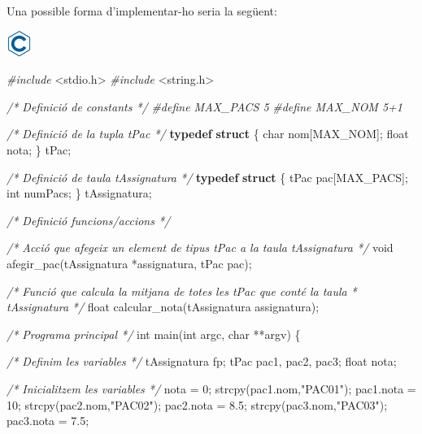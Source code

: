 \documentclass[]{book}
\newenvironment{Shaded}{\begin{snugshade}}{\end{snugshade}}
\newcommand{\CommentTok}[1]{\textcolor[rgb]{0.56,0.35,0.01}{\textit{#1}}}
\newcommand{\DataTypeTok}[1]{\textcolor[rgb]{0.13,0.29,0.53}{#1}}
\newcommand{\DecValTok}[1]{\textcolor[rgb]{0.00,0.00,0.81}{#1}}
\newcommand{\FloatTok}[1]{\textcolor[rgb]{0.00,0.00,0.81}{#1}}
\newcommand{\ImportTok}[1]{#1}
\newcommand{\KeywordTok}[1]{\textcolor[rgb]{0.13,0.29,0.53}{\textbf{#1}}}
\newcommand{\NormalTok}[1]{#1}
\newcommand{\PreprocessorTok}[1]{\textcolor[rgb]{0.56,0.35,0.01}{\textit{#1}}}
\newcommand{\StringTok}[1]{\textcolor[rgb]{0.31,0.60,0.02}{#1}}
\begin{document}
Una possible forma d'implementar-ho seria la següent:

\includegraphics{./img/c.png}

\begin{Shaded}
\begin{Highlighting}[]
\PreprocessorTok{\#include }\ImportTok{\textless{}stdio.h\textgreater{}}
\PreprocessorTok{\#include }\ImportTok{\textless{}string.h\textgreater{}}

\CommentTok{/* Definició de constants */}
\PreprocessorTok{\#define MAX\_PACS 5}
\PreprocessorTok{\#define MAX\_NOM 5+1}

\CommentTok{/* Definició de la tupla tPac */}
\KeywordTok{typedef} \KeywordTok{struct}\NormalTok{ \{}
    \DataTypeTok{char}\NormalTok{ nom[MAX\_NOM];}
    \DataTypeTok{float}\NormalTok{ nota;}
\NormalTok{\} tPac;}

\CommentTok{/* Definició de taula tAssignatura */}
\KeywordTok{typedef} \KeywordTok{struct}\NormalTok{ \{}
\NormalTok{    tPac pac[MAX\_PACS];}
    \DataTypeTok{int}\NormalTok{ numPacs;}
\NormalTok{\} tAssignatura;}

\CommentTok{/* Definició funcions/accions */}

\CommentTok{/* Acció que afegeix un element de tipus tPac a la taula tAssignatura */}
\DataTypeTok{void}\NormalTok{ afegir\_pac(tAssignatura *assignatura, tPac pac);}

\CommentTok{/* Funció que calcula la mitjana de totes les tPac que conté la taula}
\CommentTok{ * tAssignatura }
\CommentTok{ */}
\DataTypeTok{float}\NormalTok{ calcular\_nota(tAssignatura assignatura);}

\CommentTok{/* Programa principal */}
\DataTypeTok{int}\NormalTok{ main(}\DataTypeTok{int}\NormalTok{ argc, }\DataTypeTok{char}\NormalTok{ **argv) \{}

    \CommentTok{/* Definim les variables */}
\NormalTok{    tAssignatura fp;}
\NormalTok{    tPac pac1, pac2, pac3;}
    \DataTypeTok{float}\NormalTok{ nota;}

    \CommentTok{/* Inicialitzem les variables */}
\NormalTok{    nota = }\DecValTok{0}\NormalTok{;}
\NormalTok{    strcpy(pac1.nom,}\StringTok{"PAC01"}\NormalTok{);}
\NormalTok{    pac1.nota = }\DecValTok{10}\NormalTok{;}
\NormalTok{    strcpy(pac2.nom,}\StringTok{"PAC02"}\NormalTok{);}
\NormalTok{    pac2.nota = }\FloatTok{8.5}\NormalTok{;}
\NormalTok{    strcpy(pac3.nom,}\StringTok{"PAC03"}\NormalTok{);}
\NormalTok{    pac3.nota = }\FloatTok{7.5}\NormalTok{;}


\end{Highlighting}
\end{Shaded}
\end{document}
